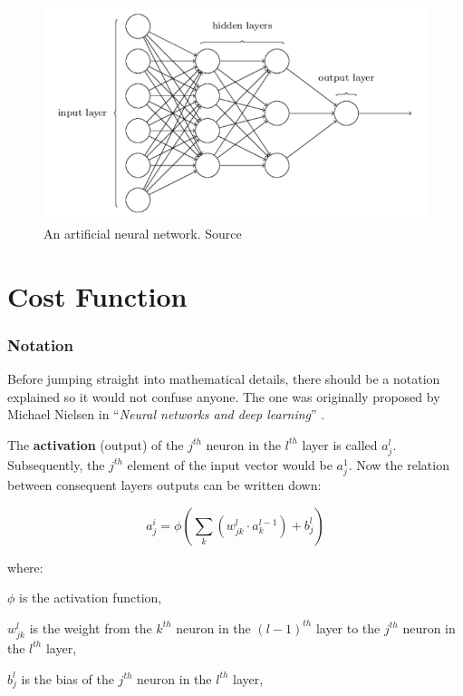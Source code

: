 \begin{figure}[h]
    \centering
    \includegraphics[width=12cm]{img/ANN-diagram.png}
    \caption{An artificial neural network. Source \cite{NNandDL}}
    \label{fig:ann}
\end{figure}

\section{Cost Function}
\label{sec:cost-function}

\subsubsection*{Notation}
\label{sub2:notation}

Before jumping straight into mathematical details, there should be a notation explained so it would not confuse anyone. The one was originally proposed by Michael Nielsen in ``\emph{Neural networks and deep learning}'' \cite{NNandDL}.

The \textbf{activation} (output) of the $j^{th}$ neuron in the $l^{th}$ layer is called $a^l_j$. Subsequently, the $j^{th}$ element of the input vector would be $a^1_j$. Now the relation between consequent layers outputs can be written down:

\begin{equation}
\label{eq:2.1}
a^i_j = \phi\left(\sum_k (w^l_{jk} \cdot a^{l-1}_k) + b^l_j\right)
\end{equation}

where:

$\phi$ is the activation function,

$w^l_{jk}$ is the weight from the $k^{th}$ neuron in the $(l-1)^{th}$ layer to the $j^{th}$ neuron in the $l^{th}$ layer,

$b^l_j$ is the bias of the $j^{th}$ neuron in the $l^{th}$ layer,

